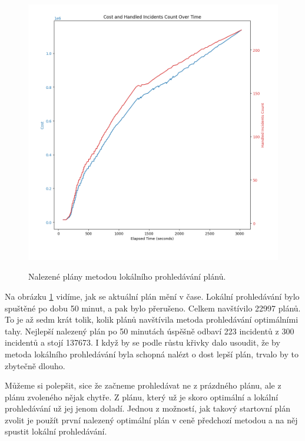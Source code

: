 \begin{figure}[H]
  \caption{Nalezené plány metodou lokálního prohledávání plánů.}
  \includegraphics[width=\textwidth]{img/local_search_empty_plan_plot.png}
  \centering
  \label{img:localSearchRes}
\end{figure}

Na obrázku \ref{img:localSearchRes} vidíme, jak se aktuální plán mění v čase.
Lokální prohledávání bylo spuštěné po dobu 50 minut, a pak bylo přerušeno. 
Celkem navštívilo 22997 plánů. To je až sedm krát tolik, kolik plánů navštívila metoda prohledávání optimálními tahy.
Nejlepší nalezený plán po 50 minutách úspěšně odbaví 223 incidentů z 300 incidentů a stojí 137673.
I když by se podle růstu křivky dalo usoudit, že by metoda lokálního prohledávání byla schopná nalézt o dost lepší plán, trvalo by to zbytečně dlouho.

Můžeme si polepšit, sice že začneme prohledávat ne z prázdného plánu, ale z plánu zvoleného nějak chytře. Z plánu, který už je skoro optimální a lokální prohledávání
už jej jenom doladí. Jednou z možností, jak takový startovní plán zvolit je použít první nalezený optimální plán v ceně předchozí metodou a na něj spustit lokální prohledávání.

